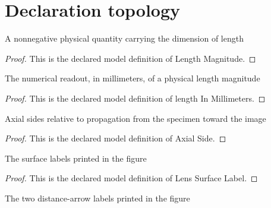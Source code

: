 \section{Declaration topology}
\begin{definition}
  \label{def:physics:phyx-mini-0057:phyxminiproblems-problemphyxmini0057-lengthmagnitude}
  A nonnegative physical quantity carrying the dimension of length
\end{definition}
\begin{proof}
  This is the declared model definition of Length Magnitude.
\end{proof}
\begin{definition}
  \label{def:physics:phyx-mini-0057:phyxminiproblems-problemphyxmini0057-lengthinmillimeters}
  The numerical readout, in millimeters, of a physical length magnitude
\end{definition}
\begin{proof}
  This is the declared model definition of length In Millimeters.
\end{proof}
\begin{definition}
  \label{def:physics:phyx-mini-0057:phyxminiproblems-problemphyxmini0057-axialside}
  Axial sides relative to propagation from the specimen toward the image
\end{definition}
\begin{proof}
  This is the declared model definition of Axial Side.
\end{proof}
\begin{definition}
  \label{def:physics:phyx-mini-0057:phyxminiproblems-problemphyxmini0057-lenssurfacelabel}
  The surface labels printed in the figure
\end{definition}
\begin{proof}
  This is the declared model definition of Lens Surface Label.
\end{proof}
\begin{definition}
  \label{def:physics:phyx-mini-0057:phyxminiproblems-problemphyxmini0057-figuredistancelabel}
  The two distance-arrow labels printed in the figure
\end{definition}
